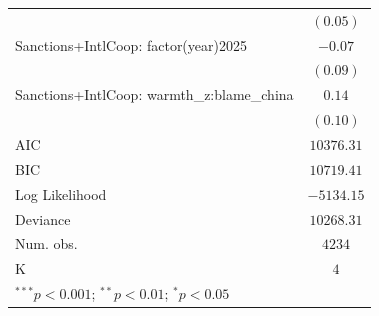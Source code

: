 \begin{tabular}{l c}
                                           & $(0.05)$      \\
Sanctions+IntlCoop: factor(year)2025       & $-0.07$       \\
                                           & $(0.09)$      \\
Sanctions+IntlCoop: warmth\_z:blame\_china & $0.14$        \\
                                           & $(0.10)$      \\
\hline
AIC                                        & $10376.31$    \\
BIC                                        & $10719.41$    \\
Log Likelihood                             & $-5134.15$    \\
Deviance                                   & $10268.31$    \\
Num. obs.                                  & $4234$        \\
K                                          & $4$           \\
\hline
\multicolumn{2}{l}{\scriptsize{$^{***}p<0.001$; $^{**}p<0.01$; $^{*}p<0.05$}}
\end{tabular}
